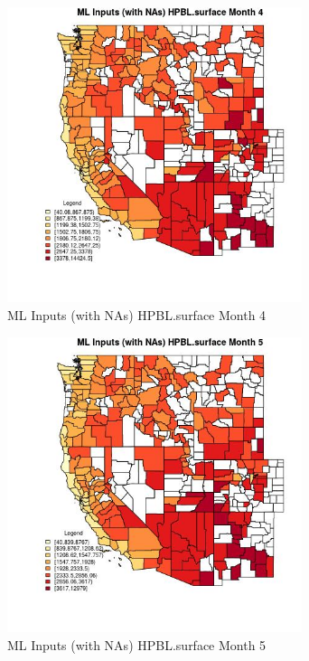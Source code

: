 \begin{figure} 
\centering  
\includegraphics[width=0.77\textwidth]{Code_Outputs/Report_ML_input_PM25_Step4_part_f_de_duplicated_aves_prioritize_24hr_obswNAs_CountyHPBLsurfacemedianMonth4.jpg} 
\caption{\label{fig:Report_ML_input_PM25_Step4_part_f_de_duplicated_aves_prioritize_24hr_obswNAsCountyHPBLsurfacemedianMonth4}ML Inputs (with NAs) HPBL.surface Month 4} 
\end{figure} 
 

\begin{figure} 
\centering  
\includegraphics[width=0.77\textwidth]{Code_Outputs/Report_ML_input_PM25_Step4_part_f_de_duplicated_aves_prioritize_24hr_obswNAs_CountyHPBLsurfacemedianMonth5.jpg} 
\caption{\label{fig:Report_ML_input_PM25_Step4_part_f_de_duplicated_aves_prioritize_24hr_obswNAsCountyHPBLsurfacemedianMonth5}ML Inputs (with NAs) HPBL.surface Month 5} 
\end{figure} 
 


